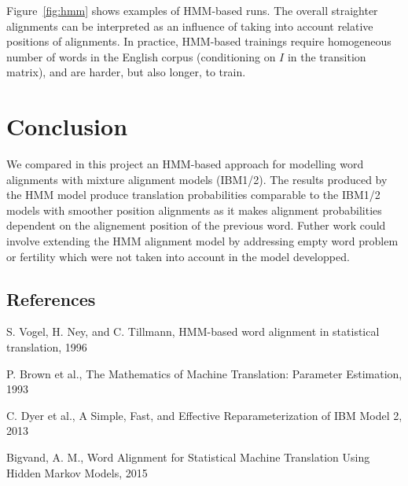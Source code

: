 \documentclass[final]{beamer}
\begin{document}
\begin{frame}[t]
\begin{multicols}{3}
Figure~\ref{fig:hmm} shows examples of HMM-based runs. The overall straighter alignments can be interpreted as an influence of taking into account relative positions of alignments. In practice, HMM-based trainings require homogeneous number of words in the English corpus (conditioning on $I$ in the transition matrix), and are harder, but also longer, to train. 

\section{Conclusion}

We compared in this project an HMM-based approach for modelling word alignments with mixture alignment models (IBM1/2). The results produced by the HMM model produce translation probabilities comparable to the IBM1/2 models with smoother position alignments as it makes alignment probabilities dependent on the alignement position of the previous word. Futher work could involve extending the HMM alignment model by addressing empty word problem or fertility which were not taken into account in the model developped.



\subsection{References}

\begin{thebibliography}{99}

 S. Vogel, H. Ney, and C. Tillmann, HMM-based word alignment in statistical translation, 1996

 P. Brown et al., The Mathematics of Machine Translation: Parameter Estimation, 1993

 C. Dyer et al., A Simple, Fast, and Effective Reparameterization of IBM Model 2, 2013

 Bigvand, A. M., Word Alignment for Statistical Machine Translation Using Hidden Markov Models, 2015

\end{thebibliography}

\end{multicols}

\end{frame}
\end{document}
